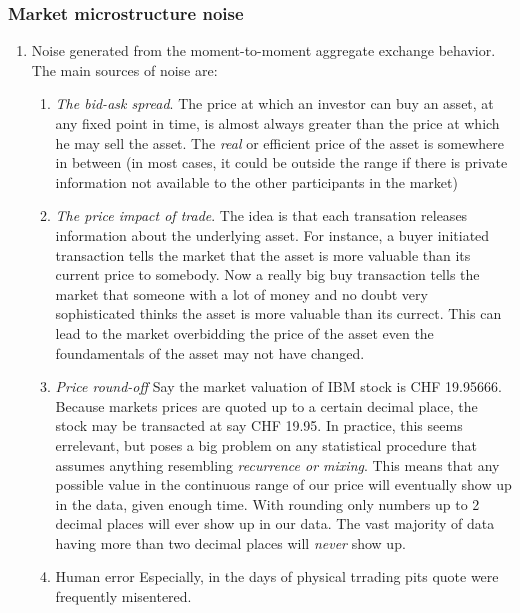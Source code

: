 \documentclass[fleqn]{beamer}
\begin{document}
\begin{frame}[allowframebreaks]
  \frametitle{Market microstructure noise}
\begin{enumerate}
  \item Noise generated from the moment-to-moment aggregate exchange behavior. The main sources of noise are:
    \begin{enumerate}
      \item \emph{The bid-ask spread}. The price at which an investor can buy an asset, at any fixed point in time,   is almost always greater than the price at which he may sell the asset. The \emph{real} or efficient price of the asset is somewhere in between (in most cases, it could be outside the range if there is private information not available to the other participants in the market)
      \item \emph{The price impact of trade}. The idea is that each transation releases information about the underlying asset. For instance, a buyer initiated transaction tells the market that the asset is more valuable than its current price to somebody. Now a really big buy transaction tells the market that someone with a lot of money and no doubt very sophisticated thinks the asset is more valuable than its currect. This can lead to the market overbidding the price of the asset even the foundamentals of the asset may not have changed.
      \item \emph{Price round-off} Say the market valuation of IBM stock is CHF 19.95666. Because markets prices are quoted up to a certain decimal place, the stock may be transacted at say CHF 19.95. In practice, this seems errelevant, but poses a big problem on any statistical procedure that assumes anything resembling \emph{recurrence or mixing}. This means that any possible value in the continuous range of our price will eventually show up in the data, given enough time. With rounding only numbers up to 2 decimal places will ever show up in our data. The vast majority of data having more than two decimal places will \emph{never} show up.
      \item{Human error} Especially, in the days of physical trrading pits quote were frequently misentered.
\end{enumerate}
\end{enumerate}
\end{frame}
\end{document}
